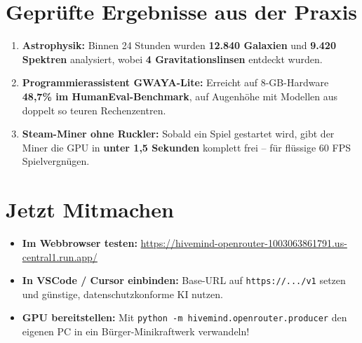 \documentclass[11pt,a4paper]{report}
\begin{document}
\section{Geprüfte Ergebnisse aus der Praxis}
\begin{enumerate}[leftmargin=1.8em]
    \item \textbf{Astrophysik:} Binnen 24 Stunden wurden \textbf{12.840 Galaxien} und \textbf{9.420 Spektren} analysiert, wobei \textbf{4 Gravitationslinsen} entdeckt wurden.
    \item \textbf{Programmierassistent GWAYA-Lite:} Erreicht auf 8-GB-Hardware \textbf{48,7\% im HumanEval-Benchmark}, auf Augenhöhe mit Modellen aus doppelt so teuren Rechenzentren.
    \item \textbf{Steam-Miner ohne Ruckler:} Sobald ein Spiel gestartet wird, gibt der Miner die GPU in \textbf{unter 1,5 Sekunden} komplett frei – für flüssige 60 FPS Spielvergnügen.
\end{enumerate}

\section{Jetzt Mitmachen}
\begin{itemize}[leftmargin=1.8em]
    \item \textbf{Im Webbrowser testen:} \url{https://hivemind-openrouter-1003063861791.us-central1.run.app/}
    \item \textbf{In VSCode / Cursor einbinden:} Base-URL auf \texttt{https://.../v1} setzen und günstige, datenschutzkonforme KI nutzen.
    \item \textbf{GPU bereitstellen:} Mit \texttt{python -m hivemind.openrouter.producer} den eigenen PC in ein Bürger-Minikraftwerk verwandeln!
\end{itemize}
\end{document}
